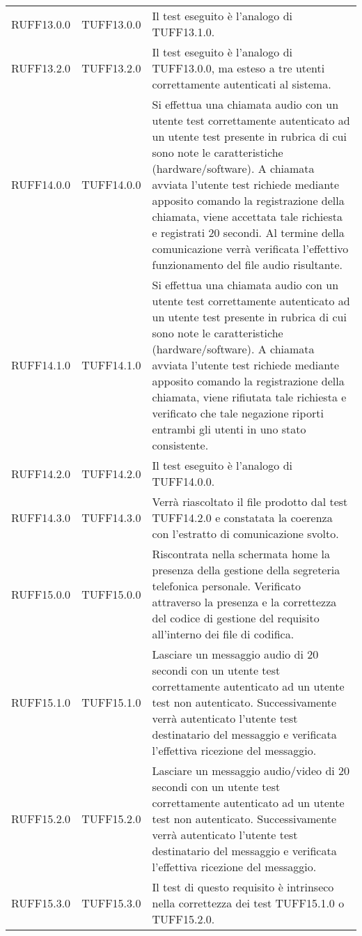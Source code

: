 \begin{center}
\begin{longtable}{llp{}}
RUFF13.0.0 & TUFF13.0.0& Il test eseguito è l'analogo di TUFF13.1.0.\\
RUFF13.2.0 & TUFF13.2.0& Il test eseguito è l'analogo di TUFF13.0.0, ma esteso a tre utenti correttamente autenticati al sistema.\\
RUFF14.0.0 & TUFF14.0.0& Si effettua una chiamata audio con un utente test correttamente autenticato ad un utente test presente in rubrica di cui sono note le caratteristiche (hardware/software). A chiamata avviata l'utente test richiede mediante apposito comando la registrazione della chiamata, viene accettata tale richiesta e registrati 20 secondi. Al termine della comunicazione verrà verificata l'effettivo funzionamento del file audio risultante.\\
RUFF14.1.0 & TUFF14.1.0& Si effettua una chiamata audio con un utente test correttamente autenticato ad un utente test presente in rubrica di cui sono note le caratteristiche (hardware/software). A chiamata avviata l'utente test richiede mediante apposito comando la registrazione della chiamata, viene rifiutata tale richiesta e verificato che tale negazione riporti entrambi gli utenti in uno stato consistente.\\
RUFF14.2.0 & TUFF14.2.0& Il test eseguito è l'analogo di TUFF14.0.0.\\
RUFF14.3.0 & TUFF14.3.0& Verrà riascoltato il file prodotto dal test TUFF14.2.0 e constatata la coerenza con l'estratto di comunicazione svolto.\\
RUFF15.0.0 & TUFF15.0.0& Riscontrata nella schermata home la presenza della gestione della segreteria telefonica personale. Verificato attraverso la presenza e la correttezza del codice di gestione del requisito all'interno dei file di codifica.\\
RUFF15.1.0 & TUFF15.1.0& Lasciare un messaggio audio di 20 secondi con un utente test correttamente autenticato ad un utente test non autenticato. Successivamente verrà autenticato l'utente test destinatario del messaggio e verificata l'effettiva ricezione del messaggio.\\
RUFF15.2.0 & TUFF15.2.0& Lasciare un messaggio audio/video di 20 secondi con un utente test correttamente autenticato ad un utente test non autenticato. Successivamente verrà autenticato l'utente test destinatario del messaggio e verificata l'effettiva ricezione del messaggio.\\
RUFF15.3.0 & TUFF15.3.0& Il test di questo requisito è intrinseco nella correttezza dei test  TUFF15.1.0 o TUFF15.2.0.\\

\end{longtable}
\end{center}
